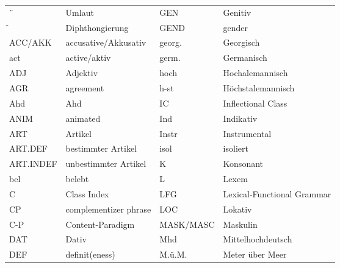 \begin{tabularx}{\textwidth}{lXlX}                                          
¨        &    Umlaut &                                             GEN        &    Genitiv \\
\hspace*{.5ex} ̑         &    Diphthongierung &                                  GEND        &    gender \\
ACC/AKK  &    accusative/Akkusativ &                               georg.        &    Georgisch \\
act        &    active/aktiv &                                     germ.        &    Germanisch \\
ADJ        &    Adjektiv &                                         hoch        &    Hochalemannisch \\
AGR        &    agreement &                                        h-st        &    Höchstalemannisch \\
Ahd        &    Ahd &                                              IC        &    Inflectional Class \\
ANIM        &    animated &                                        Ind        &    Indikativ \\
ART        &    Artikel &                                          Instr        &    Instrumental \\
ART.DEF        &    bestimmter Artikel &                           isol        &    isoliert \\
ART.INDEF        &    unbestimmter Artikel &                       K        &    Konsonant \\
bel        &    belebt &                                           L        &    Lexem \\
C        &    Class Index &                                        LFG        &    Lexical-Functional Grammar \\
CP        &    complementizer phrase &                             LOC        &    Lokativ \\
C-P        &    Content-Paradigm &                                 MASK/MASC        &    Maskulin \\
DAT        &    Dativ &                                            Mhd        &    Mittelhochdeutsch \\
DEF        &    definit(eness) &                                   M.ü.M.        &    Meter über Meer \\

\end{tabularx}
